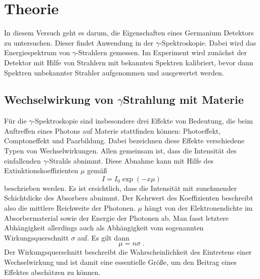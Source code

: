 \section{Theorie}
\label{sec:Theorie}

In diesem Versuch geht es darum, die Eigenschaften eines Germanium Detektors zu untersuchen. Dieser findet Anwendung in der $\gamma$-Spektroskopie. Dabei wird das Energiespektrum von $\gamma$-Strahlern gemessen. Im Experiment wird zunächst der Detektor mit Hilfe von Strahlern mit bekannten Spektren kalibriert, bevor dann Spektren unbekannter Strahler aufgenommen und ausgewertet werden.

\subsection{Wechselwirkung von \texorpdfstring{$\gamma$}-Strahlung mit Materie}
\label{sec:ww}
Für die $\gamma$-Spektroskopie sind insbesondere drei Effekte von Bedeutung, die beim Auftreffen eines Photons auf Materie stattfinden können: Photoeffekt, Comptoneffekt und Paarbildung. Dabei bezeichnen diese Effekte verschiedene Typen von Wechselwirkungen. Allen gemeinsam ist, dass die Intensität des einfallenden $\gamma$-Strahls abnimmt. Diese Abnahme kann mit Hilfe des Extinktionskoeffizienten $\mu$ gemäß
\begin{equation}
  I = I_0 \exp(-x\mu)
  \label{eq:extinktion}
\end{equation}
beschrieben werden. Es ist ersichtlich, dass die Intensität mit zunehmender Schichtdicke des Absorbers abnimmt. Der Kehrwert des Koeffizienten beschreibt also die mittlere Reichweite der Photonen. $\mu$ hängt von der Elektronendichte im Absorbermaterial sowie der Energie der Photonen ab. Man fasst letztere Abhängigkeit allerdings auch als Abhängigkeit vom sogenannten Wirkungsquerschnitt $\sigma$ auf. Es gilt dann
\begin{equation}
  \mu = n \sigma  \; .
  \label{eq:wq}
\end{equation}
Der Wirkungsquerschnitt beschreibt die Wahrscheinlichkeit des Eintretens einer Wechselwirkung und ist damit eine essentielle Größe, um den Beitrag eines Effektes abschätzen zu können.

